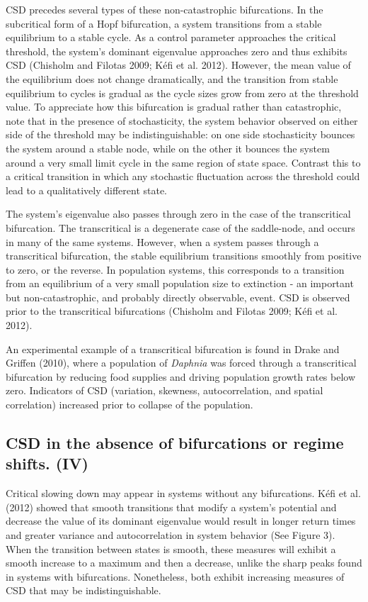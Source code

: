 \documentclass[author-year, review]{elsarticle} %
\begin{document}
CSD precedes several types of these non-catastrophic bifurcations. In
the subcritical form of a Hopf bifurcation, a system transitions from a
stable equilibrium to a stable cycle. As a control parameter approaches
the critical threshold, the system's dominant eigenvalue approaches zero
and thus exhibits CSD (Chisholm and Filotas 2009; Kéfi et al. 2012).
However, the mean value of the equilibrium does not change dramatically,
and the transition from stable equilibrium to cycles is gradual as the
cycle sizes grow from zero at the threshold value. To appreciate how
this bifurcation is gradual rather than catastrophic, note that in the
presence of stochasticity, the system behavior observed on either side
of the threshold may be indistinguishable: on one side stochasticity
bounces the system around a stable node, while on the other it bounces
the system around a very small limit cycle in the same region of state
space. Contrast this to a critical transition in which any stochastic
fluctuation across the threshold could lead to a qualitatively different
state.

The system's eigenvalue also passes through zero in the case of the
transcritical bifurcation. The transcritical is a degenerate case of the
saddle-node, and occurs in many of the same systems. However, when a
system passes through a transcritical bifurcation, the stable
equilibrium transitions smoothly from positive to zero, or the reverse.
In population systems, this corresponds to a transition from an
equilibrium of a very small population size to extinction - an important
but non-catastrophic, and probably directly observable, event. CSD is
observed prior to the transcritical bifurcations (Chisholm and Filotas
2009; Kéfi et al. 2012).

An experimental example of a transcritical bifurcation is found in Drake
and Griffen (2010), where a population of \emph{Daphnia} was forced
through a transcritical bifurcation by reducing food supplies and
driving population growth rates below zero. Indicators of CSD
(variation, skewness, autocorrelation, and spatial correlation)
increased prior to collapse of the population.

\subsection{CSD in the absence of bifurcations or regime shifts. (IV)}

Critical slowing down may appear in systems without any bifurcations.
Kéfi et al. (2012) showed that smooth transitions that modify a system's
potential and decrease the value of its dominant eigenvalue would result
in longer return times and greater variance and autocorrelation in
system behavior (See Figure 3). When the transition between states is
smooth, these measures will exhibit a smooth increase to a maximum and
then a decrease, unlike the sharp peaks found in systems with
bifurcations. Nonetheless, both exhibit increasing measures of CSD that
may be indistinguishable.
\end{document}
